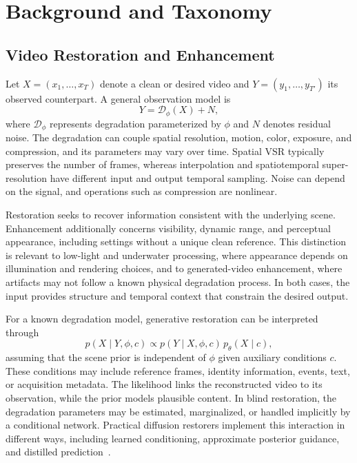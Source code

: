 \section{Background and Taxonomy}
\label{sec:formulation}
\subsection{Video Restoration and Enhancement}
Let $X=(x_1,\ldots,x_T)$ denote a clean or desired video and $Y=(y_1,\ldots,y_{T'})$ its observed counterpart. A general observation model is
\begin{equation}
Y=\mathcal{D}_{\phi}(X)+N,
\label{eq:observation}
\end{equation}
where $\mathcal{D}_{\phi}$ represents degradation parameterized by $\phi$ and $N$ denotes residual noise. The degradation can couple spatial resolution, motion, color, exposure, and compression, and its parameters may vary over time. Spatial VSR typically preserves the number of frames, whereas interpolation and spatiotemporal super-resolution have different input and output temporal sampling. Noise can depend on the signal, and operations such as compression are nonlinear.

Restoration seeks to recover information consistent with the underlying scene. Enhancement additionally concerns visibility, dynamic range, and perceptual appearance, including settings without a unique clean reference. This distinction is relevant to low-light and underwater processing, where appearance depends on illumination and rendering choices, and to generated-video enhancement, where artifacts may not follow a known physical degradation process. In both cases, the input provides structure and temporal context that constrain the desired output.

For a known degradation model, generative restoration can be interpreted through
\begin{equation}
p(X\mid Y,\phi,c)\propto p(Y\mid X,\phi,c)\,p_{\theta}(X\mid c),
\label{eq:posterior}
\end{equation}
assuming that the scene prior is independent of $\phi$ given auxiliary conditions $c$. These conditions may include reference frames, identity information, events, text, or acquisition metadata. The likelihood links the reconstructed video to its observation, while the prior models plausible content. In blind restoration, the degradation parameters may be estimated, marginalized, or handled implicitly by a conditional network. Practical diffusion restorers implement this interaction in different ways, including learned conditioning, approximate posterior guidance, and distilled prediction~\cite{ddrm,dps,seedvr2}.

